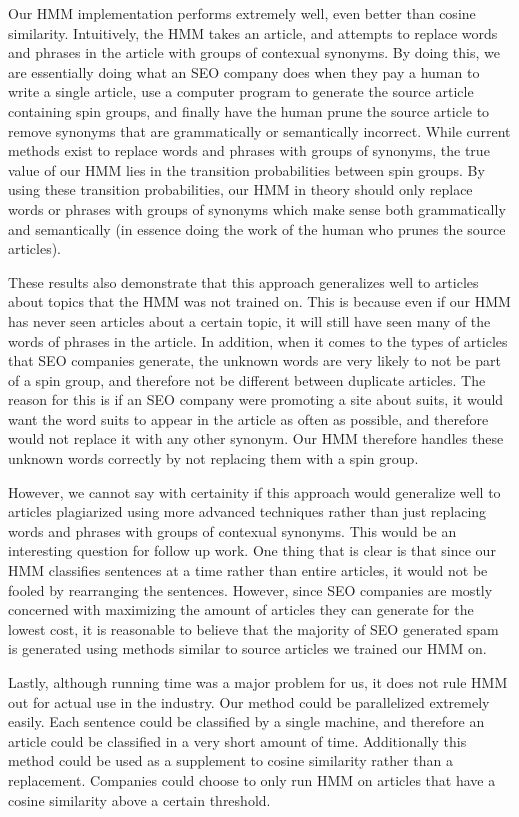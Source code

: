 \documentclass[11pt,letterpaper,oneside, titlepage]{scrartcl}
\begin{document}
Our HMM implementation performs extremely well, even better than cosine similarity. Intuitively, the HMM takes an article, and attempts to replace words and phrases in the article with groups of contexual synonyms. By doing this, we are essentially doing what an SEO company does when they pay a human to write a single article, use a computer program to generate the source article containing spin groups, and finally have the human prune the source article to remove synonyms that are grammatically or semantically incorrect. While current methods exist to replace words and phrases with groups of synonyms, the true value of our HMM lies in the transition probabilities between spin groups. By using these transition probabilities, our HMM in theory should only replace words or phrases with groups of synonyms which make sense both grammatically and semantically (in essence doing the work of the human who prunes the source articles). 

These results also demonstrate that this approach generalizes well to articles about topics that the HMM was not trained on. This is because even if our HMM has never seen articles about a certain topic, it will still have seen many of the words of phrases in the article. In addition, when it comes to the types of articles that SEO companies generate, the unknown words are very likely to not be part of a spin group, and therefore not be different between duplicate articles. The reason for this is if an SEO company were promoting a site about suits, it would want the word suits to appear in the article as often as possible, and therefore would not replace it with any other synonym. Our HMM therefore handles these unknown words correctly by not replacing them with a spin group. 

However, we cannot say with certainity if this approach would generalize well to articles plagiarized using more advanced techniques rather than just replacing words and phrases with groups of contexual synonyms. This would be an interesting question for follow up work. One thing that is clear is that since our HMM classifies sentences at a time rather than entire articles, it would not be fooled by rearranging the sentences. However, since SEO companies are mostly concerned with maximizing the amount of articles they can generate for the lowest cost, it is reasonable to believe that the majority of SEO generated spam is generated using methods similar to source articles we trained our HMM on.

Lastly, although running time was a major problem for us, it does not rule HMM out for actual use in the industry. Our method could be parallelized extremely easily. Each sentence could be classified by a single machine, and therefore an article could be classified in a very short amount of time. Additionally this method could be used as a supplement to cosine similarity rather than a replacement. Companies could choose to only run HMM on articles that have a cosine similarity above a certain threshold.
\end{document}
